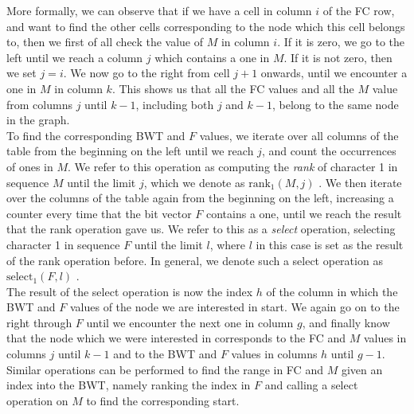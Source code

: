 \documentclass[a4paper,12pt,twoside,BCOR=10mm]{scrbook}
\begin{document}
More formally, we can observe that
if we have a cell in column $ i $ of the FC row, and want to find the other cells corresponding to
the node which this cell belongs to, then we first of all check the value of $ M $ in column $ i $.
If it is zero, we go to the left until we reach a column $ j $ which contains a one in $ M $.
If it is not zero, then we set $ j = i $.
We now go to the right from cell $ j + 1 $ onwards, until we encounter a one in $ M $ in column $ k $.
This shows us that all the FC values and all the $ M $ value
from columns $ j $ until $ k - 1 $, including both $ j $ and $ k - 1 $,
belong to the same node in the graph. \\
To find the corresponding BWT and $ F $ values, we iterate over all columns of the table from the beginning on
the left until we reach $ j $, and count the occurrences of ones in $ M $.
We refer to this operation as computing the \textit{rank} of character 1 in sequence $ M $ until the limit $ j $,
which we denote as $ \textrm{rank}_1 ( M, j ) $ \citep{Siren2009}.\label{def:rank}
We then iterate over the columns of the table again from the beginning on the left,
increasing a counter every time that the bit vector $ F $ contains a one, until we reach
the result that the rank operation gave us.
We refer to this as a \textit{select} operation, selecting character 1 in sequence $ F $ until the limit $ l $,
where $ l $ in this case is set as the result of the rank operation before. In general,
we denote such a select operation as $ \textrm{select}_1 ( F, l ) $ \citep{Siren2009}.\label{def:select} \\
The result of the select operation is now the index $ h $ of the column in which the BWT and $ F $ values
of the node we are interested in start.
We again go on to the right through $ F $ until we encounter the next one in column $ g $,
and finally know that the node which we were interested in corresponds to the
FC and $ M $ values in columns $ j $ until $ k - 1 $ and to the BWT and $ F $ values in columns $ h $ until $ g - 1 $. \\
Similar operations can be performed to find the range in FC and $ M $ given an index into the BWT,
namely ranking the index in $ F $ and calling a select operation on $ M $ to find the corresponding start.
\end{document}
